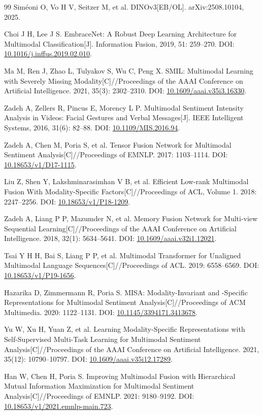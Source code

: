 {\begin{thebibliography}{99}
Sim{\'e}oni O, Vo H V, Seitzer M, et al. DINOv3[EB/OL]. arXiv:2508.10104, 2025.

 Choi J H, Lee J S. EmbraceNet: A Robust Deep Learning Architecture for Multimodal Classification[J]. Information Fusion, 2019, 51: 259--270. DOI: \url{10.1016/j.inffus.2019.02.010}.

 Ma M, Ren J, Zhao L, Tulyakov S, Wu C, Peng X. SMIL: Multimodal Learning with Severely Missing Modality[C]//Proceedings of the AAAI Conference on Artificial Intelligence. 2021, 35(3): 2302--2310. DOI: \url{10.1609/aaai.v35i3.16330}.

 Zadeh A, Zellers R, Pincus E, Morency L P. Multimodal Sentiment Intensity Analysis in Videos: Facial Gestures and Verbal Messages[J]. IEEE Intelligent Systems, 2016, 31(6): 82--88. DOI: \url{10.1109/MIS.2016.94}.

 Zadeh A, Chen M, Poria S, et al. Tensor Fusion Network for Multimodal Sentiment Analysis[C]//Proceedings of EMNLP. 2017: 1103--1114. DOI: \url{10.18653/v1/D17-1115}.

 Liu Z, Shen Y, Lakshminarasimhan V B, et al. Efficient Low-rank Multimodal Fusion With Modality-Specific Factors[C]//Proceedings of ACL, Volume 1. 2018: 2247--2256. DOI: \url{10.18653/v1/P18-1209}.

 Zadeh A, Liang P P, Mazumder N, et al. Memory Fusion Network for Multi-view Sequential Learning[C]//Proceedings of the AAAI Conference on Artificial Intelligence. 2018, 32(1): 5634--5641. DOI: \url{10.1609/aaai.v32i1.12021}.

 Tsai Y H H, Bai S, Liang P P, et al. Multimodal Transformer for Unaligned Multimodal Language Sequences[C]//Proceedings of ACL. 2019: 6558--6569. DOI: \url{10.18653/v1/P19-1656}.

 Hazarika D, Zimmermann R, Poria S. MISA: Modality-Invariant and -Specific Representations for Multimodal Sentiment Analysis[C]//Proceedings of ACM Multimedia. 2020: 1122--1131. DOI: \url{10.1145/3394171.3413678}.

 Yu W, Xu H, Yuan Z, et al. Learning Modality-Specific Representations with Self-Supervised Multi-Task Learning for Multimodal Sentiment Analysis[C]//Proceedings of the AAAI Conference on Artificial Intelligence. 2021, 35(12): 10790--10797. DOI: \url{10.1609/aaai.v35i12.17289}.

 Han W, Chen H, Poria S. Improving Multimodal Fusion with Hierarchical Mutual Information Maximization for Multimodal Sentiment Analysis[C]//Proceedings of EMNLP. 2021: 9180--9192. DOI: \url{10.18653/v1/2021.emnlp-main.723}.


\end{thebibliography}}
